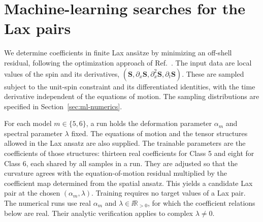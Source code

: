 \appendix
\section{Machine-learning searches for the Lax pairs}
\label{sec:ml-search}

We determine coefficients in finite Lax ans\"atze by minimizing an
off-shell residual, following the optimization approach of
Ref.~\cite{KrippendorfLustSyvaeri2021}.  The input data are local values
of the spin and its derivatives,
$(\boldsymbol S,\partial_x\boldsymbol S,
\partial_x^2\boldsymbol S,\partial_t\boldsymbol S)$.
These are sampled subject to the unit-spin constraint and its differentiated
identities, with the time derivative independent of the equations of motion.
The sampling distributions are specified in Section~\ref{sec:ml-numerics}.

For each model $m\in\{5,6\}$, a run holds the deformation parameter
$\alpha_m$ and spectral parameter $\lambda$ fixed.  The equations of motion
and the tensor structures allowed in the Lax ansatz are also supplied.
The trainable parameters are the coefficients of those structures: thirteen
real coefficients for Class 5 and eight for Class 6, each shared by all
samples in a run.  They are adjusted so that the curvature agrees with the
equation-of-motion residual multiplied by the coefficient map determined
from the spatial ansatz.  This yields a candidate Lax pair at the chosen
$(\alpha_m,\lambda)$.  Training requires no target values of a Lax pair.
The numerical runs use real $\alpha_m$ and $\lambda\in\ii\mathbb R_{>0}$,
for which the coefficient relations below are real.  Their analytic verification applies
to complex $\lambda\ne0$.

